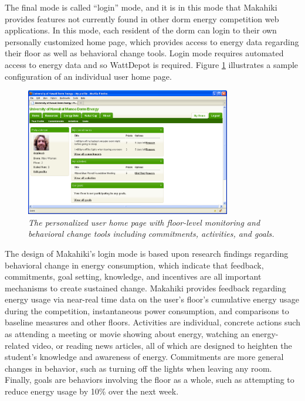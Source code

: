 The final mode is called ``login'' mode, and it is in this mode that
Makahiki provides features not currently found in other dorm energy
competition web applications.  In this mode, each resident of the dorm can
login to their own personally customized home page, which provides access
to energy data regarding their floor as well as behavioral change tools.
Login mode requires automated access to energy data and so WattDepot is
required.  Figure \ref{fig:makahiki-login} illustrates a sample
configuration of an individual user home page.

\begin{figure}[!th]
  \center
  \includegraphics[width=0.8\textwidth]{makahiki.login.eps}
  \caption{\em \small The personalized user home page with floor-level monitoring and behavioral change tools 
including commitments, activities, and goals.}
  \label{fig:makahiki-login}
\end{figure} 

The design of Makahiki's login mode is based upon research findings
regarding behavioral change in energy consumption, which indicate that
feedback, commitments, goal setting, knowledge, and incentives are all
important mechanisms to create sustained change.  Makahiki provides
feedback regarding energy usage via near-real time data on the user's
floor's cumulative energy usage during the competition, instantaneous power
consumption, and comparisons to baseline measures and other
floors. Activities are individual, concrete actions such as attending a
meeting or movie showing about energy, watching an energy-related video, or
reading news articles, all of which are designed to heighten the student's
knowledge and awareness of energy. Commitments are more general changes in
behavior, such as turning off the lights when leaving any room.  Finally,
goals are behaviors involving the floor as a whole, such as attempting to
reduce energy usage by 10\% over the next week.  

